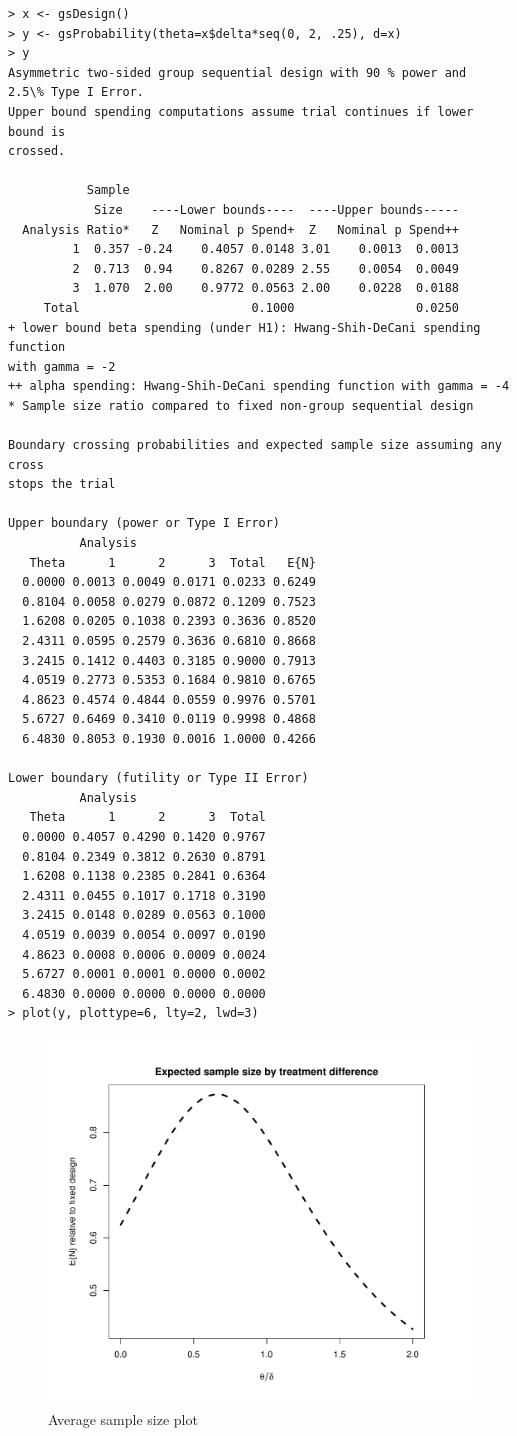 \begin{verbatim}
> x <- gsDesign()
> y <- gsProbability(theta=x$delta*seq(0, 2, .25), d=x)
> y 
Asymmetric two-sided group sequential design with 90 % power and 
2.5\% Type I Error.
Upper bound spending computations assume trial continues if lower bound is 
crossed.

           Sample
            Size    ----Lower bounds----  ----Upper bounds-----
  Analysis Ratio*   Z   Nominal p Spend+  Z   Nominal p Spend++
         1  0.357 -0.24    0.4057 0.0148 3.01    0.0013  0.0013
         2  0.713  0.94    0.8267 0.0289 2.55    0.0054  0.0049
         3  1.070  2.00    0.9772 0.0563 2.00    0.0228  0.0188
     Total                        0.1000                 0.0250 
+ lower bound beta spending (under H1): Hwang-Shih-DeCani spending function
with gamma = -2
++ alpha spending: Hwang-Shih-DeCani spending function with gamma = -4
* Sample size ratio compared to fixed non-group sequential design

Boundary crossing probabilities and expected sample size assuming any cross 
stops the trial

Upper boundary (power or Type I Error)
          Analysis
   Theta      1      2      3  Total   E{N}
  0.0000 0.0013 0.0049 0.0171 0.0233 0.6249
  0.8104 0.0058 0.0279 0.0872 0.1209 0.7523
  1.6208 0.0205 0.1038 0.2393 0.3636 0.8520
  2.4311 0.0595 0.2579 0.3636 0.6810 0.8668
  3.2415 0.1412 0.4403 0.3185 0.9000 0.7913
  4.0519 0.2773 0.5353 0.1684 0.9810 0.6765
  4.8623 0.4574 0.4844 0.0559 0.9976 0.5701
  5.6727 0.6469 0.3410 0.0119 0.9998 0.4868
  6.4830 0.8053 0.1930 0.0016 1.0000 0.4266

Lower boundary (futility or Type II Error)
          Analysis
   Theta      1      2      3  Total
  0.0000 0.4057 0.4290 0.1420 0.9767
  0.8104 0.2349 0.3812 0.2630 0.8791
  1.6208 0.1138 0.2385 0.2841 0.6364
  2.4311 0.0455 0.1017 0.1718 0.3190
  3.2415 0.0148 0.0289 0.0563 0.1000
  4.0519 0.0039 0.0054 0.0097 0.0190
  4.8623 0.0008 0.0006 0.0009 0.0024
  5.6727 0.0001 0.0001 0.0000 0.0002
  6.4830 0.0000 0.0000 0.0000 0.0000
> plot(y, plottype=6, lty=2, lwd=3)
\end{verbatim}
\begin{figure}
\begin{center}
\includegraphics[width=.6\textwidth]{figs/ASN.pdf}
\end{center}
\caption{Average sample size plot}
\end{figure}
